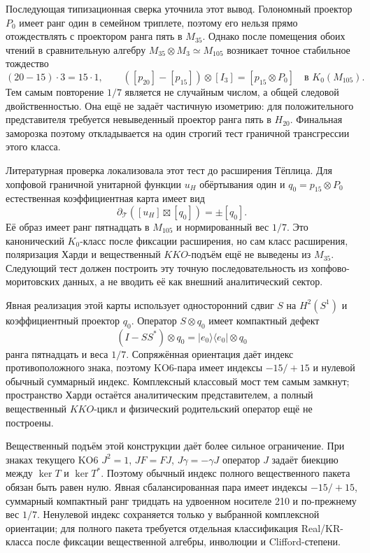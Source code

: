 Последующая типизационная сверка уточнила этот вывод. Голономный проектор
$P_0$ имеет ранг один в семейном триплете, поэтому его нельзя прямо
отождествлять с проектором ранга пять в $M_{35}$. Однако после помещения
обоих чтений в сравнительную алгебру
$M_{35}\otimes M_3\simeq M_{105}$ возникает точное стабильное тождество
\begin{equation}
 (20-15)\cdot3=15\cdot1,
 \qquad
 ([p_{20}]-[p_{15}])\otimes[I_3]=[p_{15}\otimes P_0]
 \quad\text{в }K_0(M_{105}).
\end{equation}
Тем самым повторение $1/7$ является не случайным числом, а общей
следовой двойственностью. Она ещё не задаёт частичную изометрию: для
положительного представителя требуется невыведенный проектор ранга пять
в $H_{20}$. Финальная заморозка поэтому откладывается на один строгий
тест граничной трансгрессии этого класса.

Литературная проверка локализовала этот тест до расширения Тёплица. Для
хопфовой граничной унитарной функции $u_H$ обёртывания один и
$q_0=p_{15}\otimes P_0$ естественная коэффициентная карта имеет вид
\begin{equation}
 \partial_{\mathcal T}([u_H]\boxtimes[q_0])=\pm[q_0].
\end{equation}
Её образ имеет ранг пятнадцать в $M_{105}$ и нормированный вес $1/7$.
Это канонический $K_0$-класс после фиксации расширения, но сам класс
расширения, поляризация Харди и вещественный $KKO$-подъём ещё не выведены
из $M_{35}$. Следующий тест должен построить эту точную
последовательность из хопфово-моритовских данных, а не вводить её как
внешний аналитический сектор.

Явная реализация этой карты использует односторонний сдвиг $S$ на
$H^2(S^1)$ и коэффициентный проектор $q_0$. Оператор
$S\otimes q_0$ имеет компактный дефект
\begin{equation}
 (I-SS^*)\otimes q_0
 =|e_0\rangle\langle e_0|\otimes q_0
\end{equation}
ранга пятнадцать и веса $1/7$. Сопряжённая ориентация даёт индекс
противоположного знака, поэтому KO6-пара имеет индексы $-15/+15$ и
нулевой обычный суммарный индекс. Комплексный классовый мост тем самым
замкнут; пространство Харди остаётся аналитическим представителем, а
полный вещественный $KKO$-цикл и физический родительский оператор ещё не
построены.

Вещественный подъём этой конструкции даёт более сильное ограничение.
При знаках текущего KO6
$J^2=1$, $JF=FJ$, $J\gamma=-\gamma J$ оператор $J$ задаёт биекцию между
$\ker T$ и $\ker T^*$. Поэтому обычный индекс полного вещественного
пакета обязан быть равен нулю. Явная сбалансированная пара имеет индексы
$-15/+15$, суммарный компактный ранг тридцать на удвоенном носителе 210
и по-прежнему вес $1/7$. Ненулевой индекс сохраняется только у выбранной
комплексной ориентации; для полного пакета требуется отдельная
классификация Real/KR-класса после фиксации вещественной алгебры,
инволюции и Clifford-степени.


